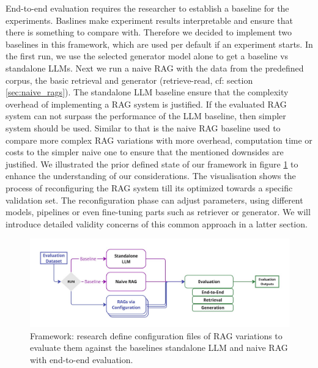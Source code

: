 End-to-end evaluation requires the researcher to establish a baseline for the experiments. Baslines make experiment results interpretable and ensure that there is something to compare with. Therefore we decided to implement two baselines in this framework, which are used per default if an experiment starts. In the first run, we use the selected generator model alone to get a baseline vs standalone LLMs. Next we run a naive RAG with the data from the predefined corpus, the basic retrieval and generator (retrieve-read, cf: section \ref{sec:naive_rags}). The standalone LLM baseline ensure that the complexity overhead of implementing a RAG system is justified. If the evaluated RAG system can not surpass the performance of the LLM baseline, then simpler system should be used. Similar to that is the naive RAG baseline used to compare more complex RAG variations with more overhead, computation time or costs to the simpler naive one to ensure that the mentioned downsides are justified. We illustrated the prior defined state of our framework in figure \ref{fig:framework-baselines} to enhance the understanding of our considerations. The visualisation shows the process of reconfiguring the RAG system till its optimized towards a specific validation set. The reconfiguration phase can adjust parameters, using different models, pipelines or even fine-tuning parts such as retriever or generator. We will introduce detailed validity concerns of this common approach in a latter section.

\begin{figure}
  \centering
  \includegraphics[width=\textwidth]{images/FrameworkBaselines.pdf}
  \caption{Framework: research define configuration files of RAG variations to evaluate them against the baselines standalone LLM and naive RAG with end-to-end evaluation.}
  \label{fig:framework-baselines}
\end{figure}



